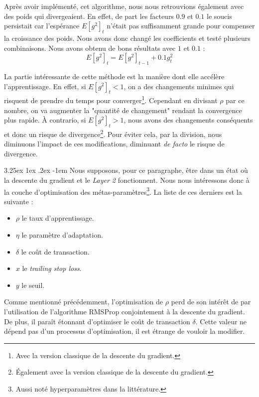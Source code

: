 \documentclass[a4paper, 11pt]{article}
\makeatletter
\renewcommand\paragraph{\@startsection{paragraph}{5}{\z@}%
  {3.25ex \@plus1ex \@minus.2ex}%
  {-1em}%
  {\normalfont\normalsize\bfseries}}
\makeatother
\begin{document}
  Après avoir implémenté, cet algorithme, nous nous retrouvions également avec des poids qui divergeaient. En effet, de part les facteurs $0.9$ et $0.1$ 
  le soucis persistait car l'espérance $E[g^2]_t$ n'était pas suffisamment grande pour compenser la croissance des poids. Nous avons donc changé les 
  coefficients et testé plusieurs combinaisons. Nous avons obtenu de bons résultats avec $1$ et $0.1$ :
  $$E[g^2]_t = E[g^2]_{t-1} + 0.1 g^2_t$$
  
  La partie intéressante de cette méthode est la manière dont elle accélère l'apprentissage. En effet, si $E[g^2]_t < 1$, on a des changements minimes 
  qui risquent de prendre du temps pour converger\footnote{Avec la version classique de la descente du gradient.}. Cependant en divisant $\rho$ par ce
  nombre, on va augmenter la "quantité de changement" rendant la convergence plus rapide. À contrario, si $E[g^2]_t > 1$, nous avons des changements 
  conséquents et donc un risque de divergence\footnote{Également avec la version classique de la descente du gradient.}. Pour éviter cela, par la division,
  nous diminuons l'impact de ces modifications, diminuant \textit{de facto} le risque de divergence.
  
  \paragraph{}
  Nous supposons, pour ce paragraphe, être dans un état où la descente du gradient et le \textit{Layer 2} fonctionnent. Nous nous intéressons donc à la couche 
  d'optimisation des métas-paramètres\footnote{Aussi noté hyperparamètres dans la littérature.}. La liste de ces derniers est la suivante :
  \begin{itemize}
   \item $\rho$ le taux d'apprentissage.
   \item $\eta$ le paramètre d'adaptation.
   \item $\delta$ le coût de transaction.
   \item $x$ le \textit{trailing stop loss}.
   \item $y$ le seuil.
  \end{itemize}

  Comme mentionné précédemment, l'optimisation de $\rho$ perd de son intérêt de par l'utilisation de l'algorithme RMSProp conjointement à la descente du
  gradient. De plus, il paraît étonnant d'optimiser le coût de transaction $\delta$. Cette valeur ne dépend pas d'un processus d'optimisation, il est
  étrange de vouloir la modifier.
  
\end{document}
